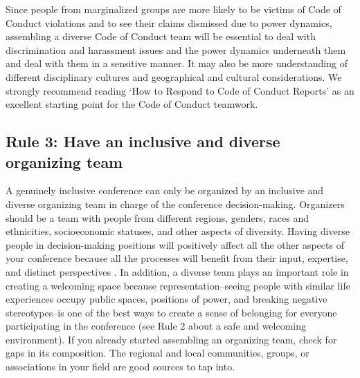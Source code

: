 \documentclass[10pt,letterpaper]{article}
\begin{document}
Since people from marginalized groups are more likely to be victims of Code of Conduct violations and to see their claims dismissed due to power dynamics, assembling a diverse Code of Conduct team will be essential to deal with discrimination and harassment issues and the power dynamics underneath them and deal with them in a sensitive manner. It may also be more understanding of different disciplinary cultures and geographical and cultural considerations. 
We strongly recommend reading `How to Respond to Code of Conduct Reports' \cite{auroraHowRespondCode2019} as an excellent starting point for the Code of Conduct teamwork.
 


\subsection*{Rule 3: Have an inclusive and diverse organizing team}
\label{rule_organizing_team}


A genuinely inclusive conference can only be organized by an inclusive and diverse organizing team in charge of the conference decision-making.
Organizers should be a team with people from different regions, genders, races and ethnicities, socioeconomic statuses, and other aspects of diversity.
Having diverse people in decision-making positions will positively affect all the other aspects of your conference because all the processes will benefit from their input, expertise, and distinct perspectives \cite{hongGroupsDiverseProblem2004}. 
In addition, a diverse team plays an important role in creating a welcoming space because representation--seeing people with similar life experiences occupy public spaces, positions of power, and breaking negative stereotypes--is one of the best ways to create a sense of belonging for everyone participating in the conference (see Rule 2 about a safe and welcoming environment). If you already started assembling an organizing team, check for gaps in its composition. 
The regional and local communities, groups, or associations in your field are good sources to tap into. 
\end{document}
